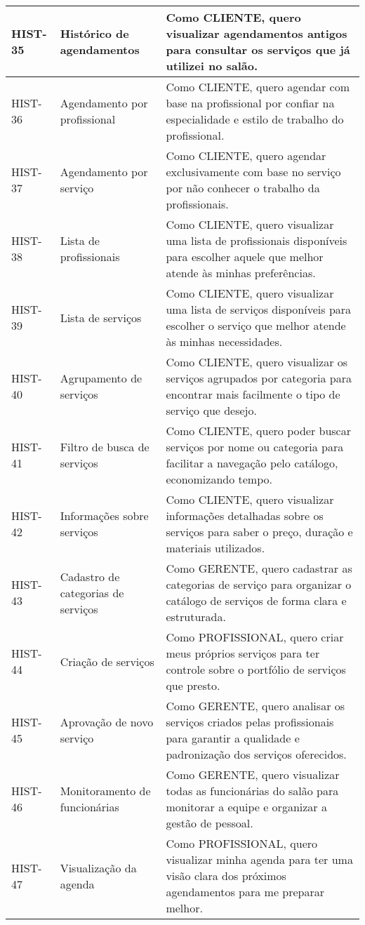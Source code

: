 \begin{longtable}{|p{2cm}|p{4cm}|p{9cm}|}
	HIST-35 & Histórico de agendamentos & Como CLIENTE, quero visualizar agendamentos antigos para consultar os serviços que já utilizei no salão. \\ \hline
	HIST-36 & Agendamento por profissional & Como CLIENTE, quero agendar com base na profissional por confiar na especialidade e estilo de trabalho do profissional. \\ \hline
	HIST-37 & Agendamento por serviço & Como CLIENTE, quero agendar exclusivamente com base no serviço por não conhecer o trabalho da profissionais. \\ \hline
	HIST-38 & Lista de profissionais & Como CLIENTE, quero visualizar uma lista de profissionais disponíveis para escolher aquele que melhor atende às minhas preferências. \\ \hline
	HIST-39 & Lista de serviços & Como CLIENTE, quero visualizar uma lista de serviços disponíveis para escolher o serviço que melhor atende às minhas necessidades. \\ \hline
	HIST-40 & Agrupamento de serviços & Como CLIENTE, quero visualizar os serviços agrupados por categoria para encontrar mais facilmente o tipo de serviço que desejo. \\ \hline
	HIST-41 & Filtro de busca de serviços & Como CLIENTE, quero poder buscar serviços por nome ou categoria para facilitar a navegação pelo catálogo, economizando tempo. \\ \hline
	HIST-42 & Informações sobre serviços & Como CLIENTE, quero visualizar informações detalhadas sobre os serviços para saber o preço, duração e materiais utilizados. \\ \hline
	HIST-43 & Cadastro de categorias de serviços & Como GERENTE, quero cadastrar as categorias de serviço para organizar o catálogo de serviços de forma clara e estruturada. \\ \hline
	HIST-44 & Criação de serviços & Como PROFISSIONAL, quero criar meus próprios serviços para ter controle sobre o portfólio de serviços que presto. \\ \hline
	HIST-45 & Aprovação de novo serviço & Como GERENTE, quero analisar os serviços criados pelas profissionais para garantir a qualidade e padronização dos serviços oferecidos. \\ \hline
	HIST-46 & Monitoramento de funcionárias & Como GERENTE, quero visualizar todas as funcionárias do salão para monitorar a equipe e organizar a gestão de pessoal. \\ \hline
	HIST-47 & Visualização da agenda & Como PROFISSIONAL, quero visualizar minha agenda para ter uma visão clara dos próximos agendamentos para me preparar melhor. \\ \hline

\end{longtable}
